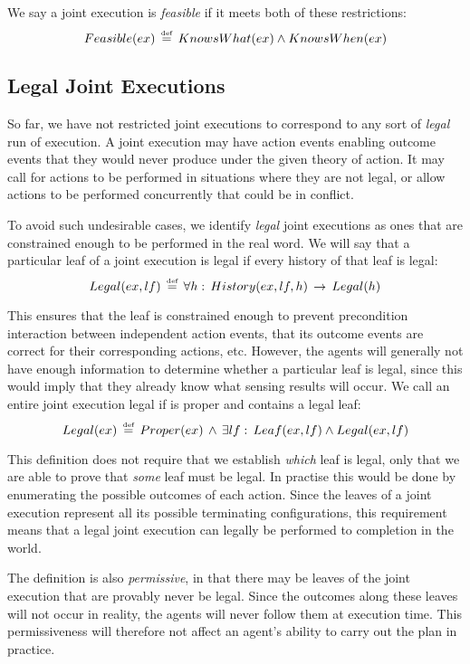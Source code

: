 We say a joint execution is \emph{feasible} if it meets both of these
restrictions:\[
Feasible(ex)\,\stackrel{\mbox{\tiny def}}{=}\, KnowsWhat(ex)\wedge KnowsWhen(ex)\]



\subsection{Legal Joint Executions}

So far, we have not restricted joint executions to correspond to any
sort of \emph{legal} run of execution. A joint execution may have
action events enabling outcome events that they would never produce
under the given theory of action. It may call for actions to be performed
in situations where they are not legal, or allow actions to be performed
concurrently that could be in conflict.

To avoid such undesirable cases, we identify \emph{legal} joint executions
as ones that are constrained enough to be performed in the real word.
We will say that a particular leaf of a joint execution is legal if
every history of that leaf is legal:\[
Legal(ex,lf)\,\stackrel{\mbox{\tiny def}}{=}\,\forall h:\, History(ex,lf,h)\,\rightarrow\, Legal(h)\]


This ensures that the leaf is constrained enough to prevent precondition
interaction between independent action events, that its outcome events
are correct for their corresponding actions, etc. However, the agents
will generally not have enough information to determine whether a
particular leaf is legal, since this would imply that they already
know what sensing results will occur. We call an entire joint execution
legal if is proper and contains a legal leaf:\[
Legal(ex)\,\stackrel{\mbox{\tiny def}}{=}\, Proper(ex)\,\wedge\,\exists lf:\, Leaf(ex,lf)\wedge Legal(ex,lf)\]


This definition does not require that we establish \emph{which} leaf
is legal, only that we are able to prove that \emph{some} leaf must
be legal. In practise this would be done by enumerating the possible
outcomes of each action. Since the leaves of a joint execution represent
all its possible terminating configurations, this requirement means
that a legal joint execution can legally be performed to completion
in the world.

The definition is also \emph{permissive}, in that there may be leaves
of the joint execution that are provably never be legal. Since the
outcomes along these leaves will not occur in reality, the agents
will never follow them at execution time. This permissiveness will
therefore not affect an agent's ability to carry out the plan in practice.


